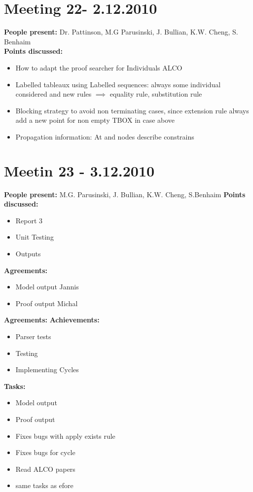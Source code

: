 \documentclass[12pt,a4paper]{article}
\begin{document}
\section*{Meeting 22- 2.12.2010}
\textbf{People present:} Dr. Pattinson, M.G Parusinski, J. Bullian, K.W. Cheng, S. Benhaim \\
\textbf{Points discussed:}
\begin{itemize}
\item How to adapt the proof searcher for Individuals ALCO 
\item Labelled tableaux using Labelled sequences: always some individual considered and new rules $\implies$ equality rule, substitution rule
\item Blocking strategy to avoid non terminating cases, since extension rule always add a new point for non empty TBOX in case above
\item Propagation information: At and nodes describe constrains
\end{itemize}

\section*{Meetin 23 - 3.12.2010}
\textbf{People present:} M.G. Parusinski, J. Bullian, K.W. Cheng, S.Benhaim
\textbf{Points discussed:}
\begin{itemize}
\item Report 3
\item Unit Testing
\item Outputs
\end{itemize}
\textbf{Agreements:}
\begin{itemize}
\item Model output Jannis
\item Proof output Michal
\end{itemize}
\textbf{Agreements:}
\textbf{Achievements:}
\begin{itemize}
\item Parser tests
\item Testing
\item Implementing Cycles
\end{itemize}
\textbf{Tasks:}
\begin{itemize}
\item Model output
\item Proof output
\item Fixes bugs with apply exists rule
\item Fixes bugs for cycle
\item Read ALCO papers
\item same tasks as efore
\end{itemize}
\end{document}
